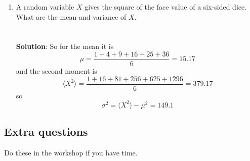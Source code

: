 \documentclass[11pt,a4paper]{scrartcl}
\begin{document}
\begin{enumerate}
 \item A random variable $X$ gives the square of the face value of a six-sided dice. What are the mean and variance of $X$.
   \\ \\ \\ \textbf{Solution}:
   So for the mean it is
   \begin{equation}
     \mu=\frac{1+4+9+16+25+36}{6}=15.17
   \end{equation}
   and the second moment is
   \begin{equation}
     \langle X^2\rangle =\frac{1+16+81+256+625+1296}{6}=379.17
   \end{equation}
   so
   \begin{equation}
     \sigma^2=\langle X^2\rangle-\mu^2=149.1
   \end{equation}
   
\end{enumerate}

\subsection*{Extra questions}
Do these in the workshop if you have time.
\end{document}
